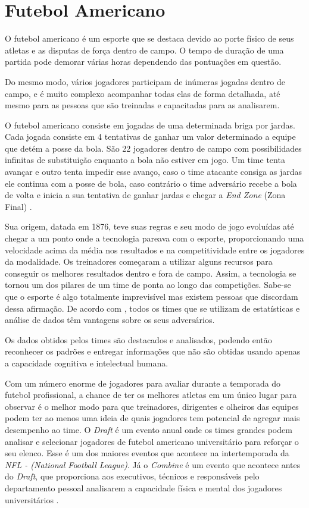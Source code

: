 \section{\textbf{{Futebol Americano}}}
\label{futebol-americano}

O futebol americano é um esporte que se destaca devido ao porte físico de seus atletas e as disputas de força dentro de campo. O tempo de duração de uma partida pode demorar várias horas dependendo das pontuações em questão.

Do mesmo modo, vários jogadores participam de inúmeras jogadas dentro de campo, e é muito complexo acompanhar todas elas de forma detalhada, até mesmo para as pessoas que são treinadas e capacitadas para as analisarem.

O futebol americano consiste em jogadas de uma determinada briga por jardas. Cada jogada consiste em 4 tentativas de ganhar um valor determinado a equipe que detém a posse da bola. São 22 jogadores dentro de campo com possibilidades infinitas de substituição enquanto a bola não estiver em jogo. Um time tenta avançar e outro tenta impedir esse avanço, caso o time atacante consiga as jardas ele continua com a posse de bola, caso contrário o time adversário recebe a bola de volta e inicia a sua tentativa de ganhar jardas e chegar a \textit{End Zone} (Zona Final) \cite{NFL2019}.

Sua origem, datada em 1876, teve suas regras e seu modo de jogo evoluídas até chegar a um ponto onde a tecnologia pareava com o esporte, proporcionando uma velocidade acima da média nos resultados e na competitividade entre os jogadores da modalidade. Os treinadores começaram a utilizar alguns recursos para conseguir os melhores resultados dentro e fora de campo. Assim, a tecnologia se tornou um dos pilares de um time de ponta ao longo das competições. Sabe-se que o esporte é algo totalmente imprevisível mas existem pessoas que discordam dessa afirmação. De acordo com , todos os times que se utilizam de estatísticas e análise de dados têm vantagens sobre os seus adversários.

Os dados obtidos pelos times são destacados e analisados, podendo então reconhecer os padrões e entregar informações que não são obtidas usando apenas a capacidade cognitiva e intelectual humana.

Com um número enorme de jogadores para avaliar durante a temporada do futebol profissional, a chance de ter os melhores atletas em um único lugar para observar é o melhor modo para que treinadores, dirigentes e olheiros das equipes podem ter ao menos uma ideia de quais jogadores tem potencial de agregar mais desempenho ao time. O \textit{Draft} é um evento anual onde os times grandes podem analisar e selecionar jogadores de futebol americano universitário para reforçar o seu elenco. Esse é um dos maiores eventos que acontece na intertemporada da \textit{NFL - (National Football League)}. Já o \textit{Combine} é um evento que acontece antes do \textit{Draft}, que proporciona aos executivos, técnicos e responsáveis pelo departamento pessoal analisarem a capacidade física e mental dos jogadores universitários \cite{MCGEE2003}.

